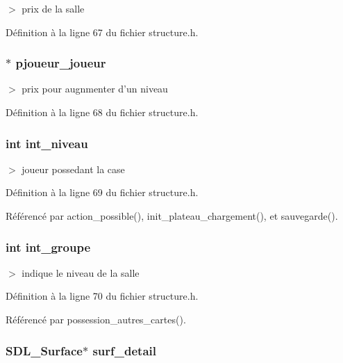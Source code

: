 $>$ prix de la salle 



D\'{e}finition \`{a} la ligne 67 du fichier structure.h.
\subsubsection{$\ast$ {\bf pjoueur\_\-joueur}}\label{structcases_ba5ddcb460f45baa1ac6d5b25436dd73}


$>$ prix pour augnmenter d'un niveau 



D\'{e}finition \`{a} la ligne 68 du fichier structure.h.
\subsubsection{\setlength{\rightskip}{0pt plus 5cm}int {\bf int\_\-niveau}}\label{structcases_16070accdfd6cd2fc42f85eb700834ed}


$>$ joueur possedant la case 



D\'{e}finition \`{a} la ligne 69 du fichier structure.h.

R\'{e}f\'{e}renc\'{e} par action\_\-possible(), init\_\-plateau\_\-chargement(), et sauvegarde().
\subsubsection{\setlength{\rightskip}{0pt plus 5cm}int {\bf int\_\-groupe}}\label{structcases_8e556ce8ee0b11e8651f9b92e5a9ff73}


$>$ indique le niveau de la salle 



D\'{e}finition \`{a} la ligne 70 du fichier structure.h.

R\'{e}f\'{e}renc\'{e} par possession\_\-autres\_\-cartes().
\subsubsection{\setlength{\rightskip}{0pt plus 5cm}SDL\_\-Surface$\ast$ {\bf surf\_\-detail}}\label{structcases_fe23bd51c8293f90f42d24e9cbd01578}


